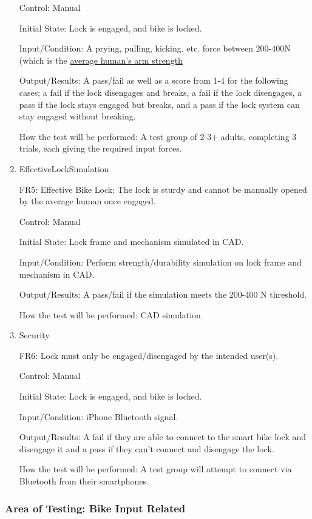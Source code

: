 \documentclass[12pt, titlepage]{article}
\begin{document}
\begin{enumerate}
Control: Manual

Initial State: Lock is engaged, and bike is locked.

Input/Condition: A prying, pulling, kicking, etc. force between 200-400N (which is the \href{https://www.tandfonline.com/doi/pdf/10.1080/10803548.2004.11076594?cookieSet=1}{average human's arm strength}

Output/Results: A pass/fail as well as a score from 1-4 for the following cases; a fail if the lock disengages and breaks, a fail if the lock disengages, a pass if the lock stays engaged but breaks, and a pass if the lock system can stay engaged without breaking.

How the test will be performed: A test group of 2-3+ adults, completing 3 trials, each giving the required input forces.

\item{EffectiveLockSimulation

FR5: Effective Bike Lock: The lock is sturdy and cannot be manually opened by the average human once engaged. }

Control: Manual

Initial State: Lock frame and mechanism simulated in CAD.

Input/Condition: Perform strength/durability simulation on lock frame and mechanism in CAD. 

Output/Results: A pass/fail if the simulation meets the 200-400 N threshold. 

How the test will be performed: CAD simulation

\item{Security

FR6: Lock must only be engaged/disengaged by the intended user(s). }

Control: Manual

Initial State: Lock is engaged, and bike is locked.

Input/Condition: iPhone Bluetooth signal.

Output/Results: A fail if they are able to connect to the smart bike lock and disengage it and a pass if they can’t connect and disengage the lock.

How the test will be performed: A test group will attempt to connect via Bluetooth from their smartphones.

\end{enumerate}

\subsubsection{Area of Testing: Bike Input Related}
\end{document}
